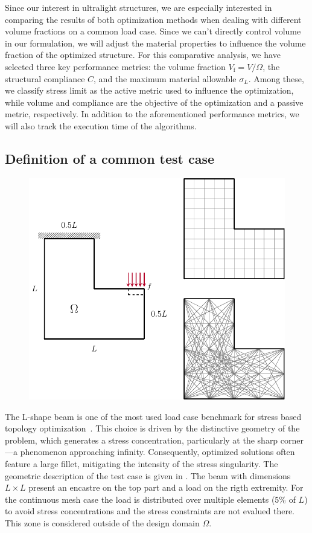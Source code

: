 Since our interest in ultralight structures, we are especially interested in comparing the results of both optimization methods when dealing with different volume fractions on a common load case. Since we can't directly control volume in our formulation, we will adjust the material properties to influence the volume fraction of the optimized structure. For this comparative analysis, we have selected three key performance metrics: the volume fraction $V_\text{f}=V/\Omega$, the structural compliance $C$, and the maximum material allowable $\sigma_L$. Among these, we classify stress limit as the active metric used to influence the optimization, while volume and compliance are the objective of the optimization and a passive metric, respectively. In addition to the aforementioned performance metrics, we will also track the execution time of the algorithms.

\subsection{Definition of a common test case}
\begin{figure}[]
    \centering
    \includegraphics[scale=0.75]{figures/03_comparison_TO_TTO/04_L_bc/L_bc.pdf}
    \caption{}
    \label{fig:03_L_bc}
\end{figure}
The L-shape beam is one of the most used load case benchmark for stress based topology optimization~. This choice is driven by the distinctive geometry of the problem, which generates a stress concentration, particularly at the sharp corner—a phenomenon approaching infinity. Consequently, optimized solutions often feature a large fillet, mitigating the intensity of the stress singularity. The geometric description of the test case is given in . The beam with dimensions $L\times L$ present an encastre on the top part and a load on the rigth extremity. For the continuous mesh case the load is distributed over multiple elements (5\% of $L$) to avoid stress concentrations and the stress constraints are not evalued there. This zone is considered outside of the design domain $\Omega$.

